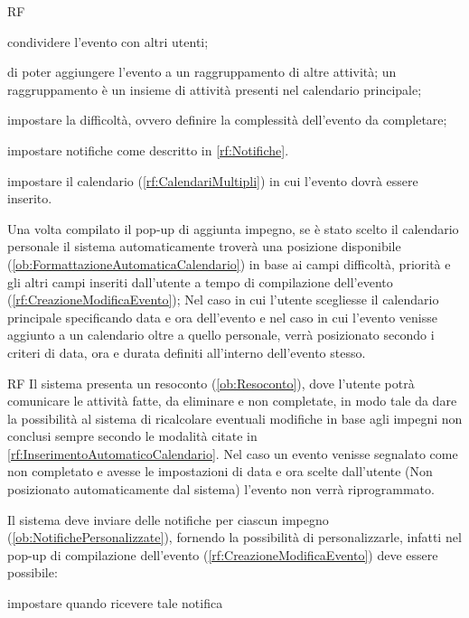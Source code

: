 \begin{listaPersonale}{RF}
\begin{listaPersonale2}[RF]{}
		 condividere l'evento con altri utenti;

		 di poter aggiungere l'evento a un raggruppamento di altre attività; un raggruppamento è un insieme di attività presenti nel calendario principale;

		 impostare la difficoltà, ovvero definire la complessità dell'evento da completare;

		 impostare notifiche come descritto in \ref{rf:Notifiche}.

		 impostare il calendario (\ref{rf:CalendariMultipli}) in cui l'evento dovrà essere inserito.
	\end{listaPersonale2}

	 Una volta compilato il pop-up di aggiunta impegno, se è stato scelto il calendario personale il sistema automaticamente troverà una posizione disponibile (\ref{ob:FormattazioneAutomaticaCalendario}) in base ai campi difficoltà, priorità e gli altri campi inseriti dall'utente a tempo di compilazione dell'evento (\ref{rf:CreazioneModificaEvento}); Nel caso in cui l'utente scegliesse il calendario principale specificando data e ora dell'evento e nel caso in cui l'evento venisse aggiunto a un calendario oltre a quello personale, verrà posizionato secondo i criteri di data, ora e durata definiti all'interno dell'evento stesso.
	\begin{listaPersonale2}{RF}
		 Il sistema presenta un resoconto (\ref{ob:Resoconto}), dove l'utente potrà comunicare le attività fatte, da eliminare e non completate, in modo tale da dare la possibilità al sistema di ricalcolare eventuali modifiche in base agli impegni non conclusi sempre secondo le modalità citate in \ref{rf:InserimentoAutomaticoCalendario}. Nel caso un evento venisse segnalato come non completato e avesse le impostazioni di data e ora scelte dall'utente (Non posizionato automaticamente dal sistema) l'evento non verrà riprogrammato.
	\end{listaPersonale2}

	 Il sistema deve inviare delle notifiche per ciascun impegno (\ref{ob:NotifichePersonalizzate}), fornendo la possibilità di personalizzarle, infatti nel pop-up di compilazione dell'evento (\ref{rf:CreazioneModificaEvento}) deve essere possibile:
	\begin{listaPersonale2}[RF]{}
		 impostare quando ricevere tale notifica


\end{listaPersonale2}
\end{listaPersonale}

